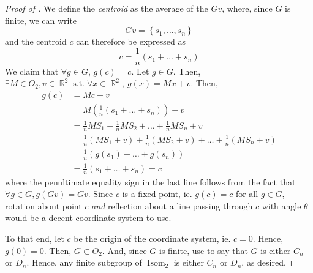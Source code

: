 \documentclass[11pt]{amsart} %
\theoremstyle{definition}
\theoremstyle{definition}
\DeclareMathOperator{\R}{\mathbb{R}}
\DeclareMathOperator{\suchthat}{\text{ s.t. }}
\DeclareMathOperator{\isom}{Isom}
\numberwithin{equation}{section}
\begin{document}
\begin{proof}[Proof of ]
	We define the \textit{centroid} as the average of the $Gv$, where, since $G$ is finite, we can write
	$$Gv = \left\{ s_1,\dots,s_n \right\}$$
	and the centroid $c$ can therefore be expressed as
	$$ c= \frac{1}{n} \left( s_1 + \dots + s_n \right) $$
	We claim that $\forall g \in G$, $g(c) =c$. Let $g \in G$. Then, $\exists M \in O_2, v\in \R^2 \suchthat \forall x \in \R^2, \: g(x)=Mx +v$. Then,
	\begin{align*}
		g(c) &= Mc + v \\
		&= M \left( \frac{1}{n} \left( s_1 + \dots + s_n \right) \right) + v \\
		&= \frac{1}{n} M S_1 + \frac{1}{n} M S_2 + \dots + \frac{1}{n} M S_n + v \\
		&= \frac{1}{n} (M S_1 + v) + \frac{1}{n} (M S_2 + v) + \dots + \frac{1}{n} (M S_n + v) \\
		&= \frac{1}{n} (g(s_1) + \dots + g(s_n) ) \\
		&= \frac{1}{n} \left( s_1 + \dots + s_n \right)  =c
	\end{align*}
	where the penultimate equality sign in the last line follows from the fact that $\forall g \in G, g(Gv) = Gv$. Since $c$ is a fixed point, ie. $g(c)=c$ for all $g \in G$, rotation about point $c$ \textit{and} reflection about a line passing through $c$ with angle $\theta$ would be a decent coordinate system to use.
	
	To that end, let $c$ be the origin of the coordinate system, ie. $c=0$. Hence, $g(0)=0$. Then, $G \subset O_2$. And, since $G$ is finite, use  to say that $G$ is either $C_n$ or $D_n$. Hence, any finite subgroup of $\isom_2$ is either $C_n$ or $D_n$, as desired.
\end{proof}
\end{document}
